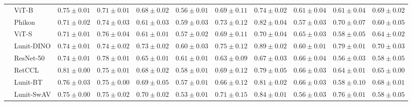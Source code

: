 \begin{tabular}{ll|cccc|c|cccc}
 & ViT-B & $0.75 \pm 0.01$ & $0.71 \pm 0.01$ & $0.68 \pm 0.02$ & $0.56 \pm 0.01$ & $0.69 \pm 0.11$ & $0.74 \pm 0.02$ & $0.61 \pm 0.04$ & $0.61 \pm 0.04$ & $0.69 \pm 0.02$ \\
 & Phikon & $0.71 \pm 0.02$ & $0.74 \pm 0.03$ & $0.61 \pm 0.03$ & $0.59 \pm 0.03$ & $0.73 \pm 0.12$ & $0.82 \pm 0.04$ & $0.57 \pm 0.03$ & $0.70 \pm 0.07$ & $0.60 \pm 0.05$ \\
 & ViT-S & $0.71 \pm 0.01$ & $0.76 \pm 0.04$ & $0.61 \pm 0.01$ & $0.57 \pm 0.02$ & $0.69 \pm 0.11$ & $0.70 \pm 0.04$ & $0.65 \pm 0.03$ & $0.58 \pm 0.05$ & $0.64 \pm 0.02$ \\
 & Lunit-DINO & $0.74 \pm 0.01$ & $0.74 \pm 0.02$ & $\mathbf{0.73 \pm 0.02}$ & $0.60 \pm 0.03$ & $\mathbf{0.75 \pm 0.12}$ & $\mathbf{0.89 \pm 0.02}$ & $0.60 \pm 0.01$ & $\mathbf{0.79 \pm 0.01}$ & $\mathbf{0.70 \pm 0.03}$ \\
 & ResNet-50 & $0.74 \pm 0.01$ & $\mathbf{0.78 \pm 0.01}$ & $0.65 \pm 0.01$ & $0.61 \pm 0.01$ & $0.63 \pm 0.09$ & $0.67 \pm 0.03$ & $0.66 \pm 0.04$ & $0.56 \pm 0.03$ & $0.58 \pm 0.05$ \\
 & RetCCL & $0.81 \pm 0.00$ & $0.75 \pm 0.01$ & $0.68 \pm 0.02$ & $0.58 \pm 0.01$ & $0.69 \pm 0.12$ & $0.79 \pm 0.05$ & $0.66 \pm 0.03$ & $0.64 \pm 0.01$ & $0.65 \pm 0.00$ \\
 & Lunit-BT & $0.76 \pm 0.03$ & $0.75 \pm 0.00$ & $0.69 \pm 0.05$ & $0.57 \pm 0.01$ & $0.66 \pm 0.12$ & $0.81 \pm 0.02$ & $0.66 \pm 0.03$ & $0.58 \pm 0.10$ & $0.68 \pm 0.01$ \\
 & Lunit-SwAV & $0.75 \pm 0.00$ & $0.75 \pm 0.02$ & $0.70 \pm 0.02$ & $0.53 \pm 0.01$ & $0.71 \pm 0.15$ & $0.84 \pm 0.01$ & $0.56 \pm 0.03$ & $0.76 \pm 0.01$ & $0.58 \pm 0.05$ \\
\cline{1-11}
\bottomrule
\end{tabular}
